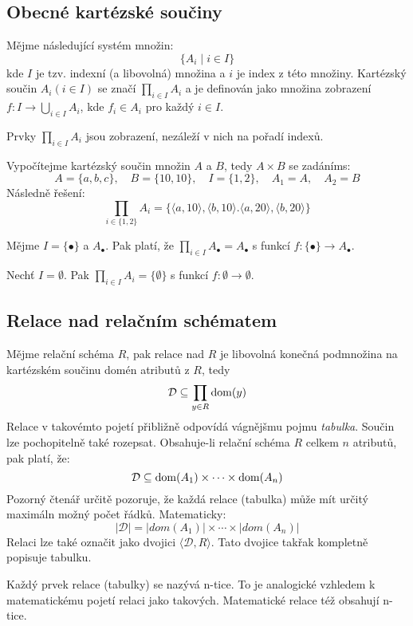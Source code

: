 \subsection{Obecné kartézské součiny}
Mějme následující systém množin:
$$
\lbrace A_{i} \; | \; i \in I \rbrace
$$
kde $I$ je tzv. indexní (a libovolná) množina a $i$ je index z této množiny. Kartézský součin $A_{i} (i \in I)$ se značí $\prod_{i \in I} A_{i}$ a je definován jako množina zobrazení $f: I \rightarrow \bigcup_{i \in I} A_{i}$, kde $f_{i} \in A_{i}$ pro každý $i \in I$.

Prvky $\prod_{i \in I} A_{i}$ jsou zobrazení, nezáleží v nich na pořadí indexů.
\begin{upexample}
Vypočítejme kartézský součin množin $A$ a $B$, tedy $A \times B$ se zadáníms:
$$
A = \lbrace a, b, c \rbrace, \quad B = \lbrace 10, 10 \rbrace, \quad I = \lbrace 1, 2 \rbrace, \quad A_{1} = A, \quad A_{2} = B
$$
Následně řešení:
$$
\prod_{i \in \lbrace 1, 2 \rbrace} A_{i} = \lbrace \langle a, 10 \rangle, \langle b, 10 \rangle. \langle a, 20 \rangle, \langle b, 20 \rangle \rbrace
$$
\end{upexample}

\begin{upexample}
Mějme $I = \lbrace \bullet \rbrace$ a $A_{\bullet}$. Pak platí, že $\prod_{i \in I} A_{\bullet} = A_{\bullet}$ s funkcí $f: \lbrace \bullet \rbrace \rightarrow A_{\bullet}$.
\end{upexample}

\begin{upexample}
Nechť $I = \emptyset$. Pak $\prod_{i \in I} A_{i} = \lbrace \emptyset \rbrace$ s funkcí $f: \emptyset \rightarrow \emptyset$.
\end{upexample}

\subsection{Relace nad relačním schématem}
\begin{uptheorem}
Mějme relační schéma $R$, pak relace nad $R$ je libovolná konečná podmnožina na kartézském součinu domén atributů z $R$, tedy
$$
\mathcal{D} \subseteq \prod_{y \in R} \operatorname{dom}(y)
$$
Relace v takovémto pojetí přibližně odpovídá vágnějšmu pojmu \textit{tabulka}. Součin lze pochopitelně také rozepsat. Obsahuje-li relační schéma $R$ celkem $n$ atributů, pak platí, že:
$$
\mathcal{D} \subseteq \operatorname{dom}(A_{1}) \times \cdots \times \operatorname{dom}(A_{n})
$$
Pozorný čtenář určitě pozoruje, že každá relace (tabulka) může mít určitý maximáln možný počet řádků. Matematicky:
$$
|\mathcal{D}| = |dom(A_{1})| \times \cdots \times |dom(A_{n})|
$$
Relaci lze také označit jako dvojici $\langle \mathcal{D}, R \rangle$. Tato dvojice takřak kompletně popisuje tabulku.
\end{uptheorem}
Každý prvek relace (tabulky) se nazývá n-tice. To je analogické vzhledem k matematickému pojetí relaci jako takových. Matematické relace též obsahují n-tice.

